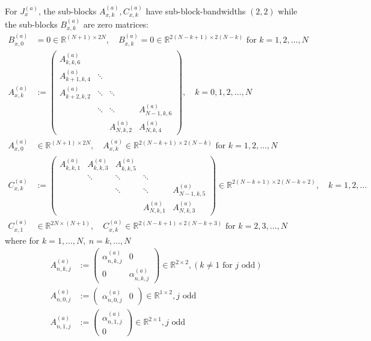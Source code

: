 \documentclass[11pt, oneside]{article}   	%
\newcommand{\bstodo}{\todo[color=pink]}
\newcommand{\R}{\mathbb{R}}
\newcommand{\alphaa}{\alpha^{(a)}}
\begin{document}
For $J_x^{(a)}$, the sub-blocks $A^{(a)}_{x, k}, C^{(a)}_{x, k}$ have sub-block-bandwidths $(2,2)$ while the sub-blocks $B^{(a)}_{x,k}$ are zero matrices: \bstodo{fix bandwidths}
\begin{align*}
	B^{(a)}_{x,0} &= 0 \in \R^{(N+1)\times2N}, \quad B^{(a)}_{x,k} = 0 \in \R^{2(N-k+1)\times2(N-k)} \text{ for } k = 1,2,\dots,N \\
	A^{(a)}_{x,k} &:= 
		\begin{pmatrix}
			A^{(a)}_{k,k,6} & & & \\
			A^{(a)}_{k+1,k,4} & \ddots & & \\
			A^{(a)}_{k+2,k,2} & \ddots & \ddots & \\
			& \ddots & \ddots & A^{(a)}_{N-1,k,6} \\
			& & A^{(a)}_{N,k,2} & A^{(a)}_{N,k,4}
		\end{pmatrix}, \quad k = 0,1,2,\dots,N \\
	A^{(a)}_{x,0} &\in \R^{(N+1)\times2N}, \quad A^{(a)}_{x,k} \in \R^{2(N-k+1)\times2(N-k)} \text{ for } k = 1,2,\dots,N \\
	C^{(a)}_{x,k} &:= 
		\begin{pmatrix}
			A^{(a)}_{k,k,1} & A^{(a)}_{k,k,3} & A^{(a)}_{k,k,5} & & \\
			& \ddots & \ddots & \ddots \\
			& & \ddots & \ddots & A^{(a)}_{N-1,k,5} \\
			& & & A^{(a)}_{N,k,1} & A^{(a)}_{N,k,3}
		\end{pmatrix} \in \R^{2(N-k+1)\times2(N-k+2)}, \quad k = 1,2,\dots \\
	C^{(a)}_{x,1} &\in \R^{2N\times(N+1)}, \quad C^{(a)}_{x,k} \in \R^{2(N-k+1)\times2(N-k+3)} \text{ for } k = 2,3,\dots,N
\end{align*}
where for $k = 1,\dots,N, \: n = k,\dots,N$
\begin{align*}
	A^{(a)}_{n,k,j} &:= 
		\begin{pmatrix}
			\alphaa_{n,k,j} & 0 \\
			0 & \alphaa_{n,k,j}
		\end{pmatrix} \in \R^{2\times2}, (k \ne 1 \text { for } j \text{ odd}) \\
	A^{(a)}_{n,0,j} &:=
		\begin{pmatrix}
			\alphaa_{n,0,j} & 0
		\end{pmatrix} \in \R^{1\times2}, j \text{ odd} \\
	A^{(a)}_{n,1,j} &:=
		\begin{pmatrix}
			\alphaa_{n,1,j} \\
			0
		\end{pmatrix} \in \R^{2\times1}, j \text{ odd} \\
\end{align*}
\end{document}
